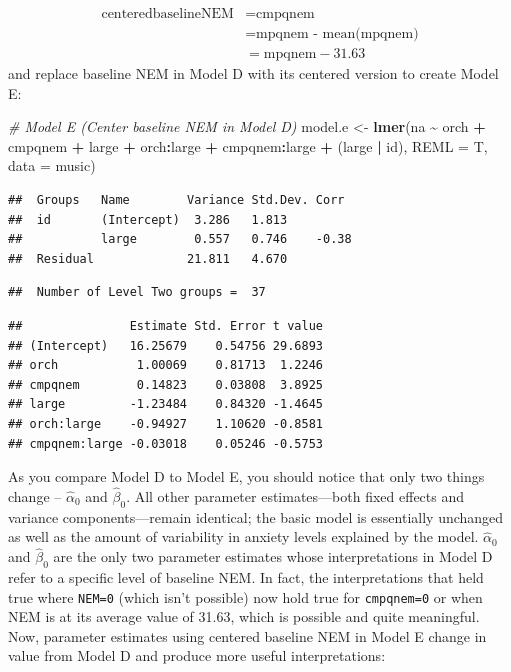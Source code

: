\documentclass[
]{krantz}
\newenvironment{Shaded}{\begin{snugshade}}{\end{snugshade}}
\newcommand{\AttributeTok}[1]{\textcolor[rgb]{0.27,0.27,0.27}{#1}}
\newcommand{\CommentTok}[1]{\textcolor[rgb]{0.37,0.37,0.37}{\textit{#1}}}
\newcommand{\FunctionTok}[1]{\textcolor[rgb]{0.27,0.27,0.27}{\textbf{#1}}}
\newcommand{\NormalTok}[1]{#1}
\newcommand{\OtherTok}[1]{\textcolor[rgb]{0.37,0.37,0.37}{#1}}
\newcommand{\SpecialCharTok}[1]{\textcolor[rgb]{0.43,0.43,0.43}{\textbf{#1}}}
\begin{document}
\begin{align*}
\textrm{centeredbaselineNEM} & = \textrm{cmpqnem} \\
 & = \textrm{mpqnem - mean(mpqnem)} \\
 & = \textrm{mpqnem} - 31.63
\end{align*}
and replace baseline NEM in Model D with its centered version to create Model E:

\begin{Shaded}
\begin{Highlighting}[]
\CommentTok{\# Model E (Center baseline NEM in Model D)}
\NormalTok{model.e }\OtherTok{\textless{}{-}} \FunctionTok{lmer}\NormalTok{(na }\SpecialCharTok{\textasciitilde{}}\NormalTok{ orch }\SpecialCharTok{+}\NormalTok{ cmpqnem }\SpecialCharTok{+}\NormalTok{ large }\SpecialCharTok{+}\NormalTok{ orch}\SpecialCharTok{:}\NormalTok{large }\SpecialCharTok{+} 
\NormalTok{  cmpqnem}\SpecialCharTok{:}\NormalTok{large }\SpecialCharTok{+}\NormalTok{ (large }\SpecialCharTok{|}\NormalTok{ id), }\AttributeTok{REML =}\NormalTok{ T, }\AttributeTok{data =}\NormalTok{ music)}
\end{Highlighting}
\end{Shaded}

\begin{verbatim}
##  Groups   Name        Variance Std.Dev. Corr 
##  id       (Intercept)  3.286   1.813         
##           large        0.557   0.746    -0.38
##  Residual             21.811   4.670
\end{verbatim}

\begin{verbatim}
##  Number of Level Two groups =  37
\end{verbatim}

\begin{verbatim}
##               Estimate Std. Error t value
## (Intercept)   16.25679    0.54756 29.6893
## orch           1.00069    0.81713  1.2246
## cmpqnem        0.14823    0.03808  3.8925
## large         -1.23484    0.84320 -1.4645
## orch:large    -0.94927    1.10620 -0.8581
## cmpqnem:large -0.03018    0.05246 -0.5753
\end{verbatim}

As you compare Model D to Model E, you should notice that only two things change -- \(\hat{\alpha}_{0}\) and \(\hat{\beta}_{0}\). All other parameter estimates---both fixed effects and variance components---remain identical; the basic model is essentially unchanged as well as the amount of variability in anxiety levels explained by the model. \(\hat{\alpha}_{0}\) and \(\hat{\beta}_{0}\) are the only two parameter estimates whose interpretations in Model D refer to a specific level of baseline NEM. In fact, the interpretations that held true where \texttt{NEM=0} (which isn't possible) now hold true for \texttt{cmpqnem=0} or when NEM is at its average value of 31.63, which is possible and quite meaningful. Now, parameter estimates using centered baseline NEM in Model E change in value from Model D and produce more useful interpretations:
\end{document}
